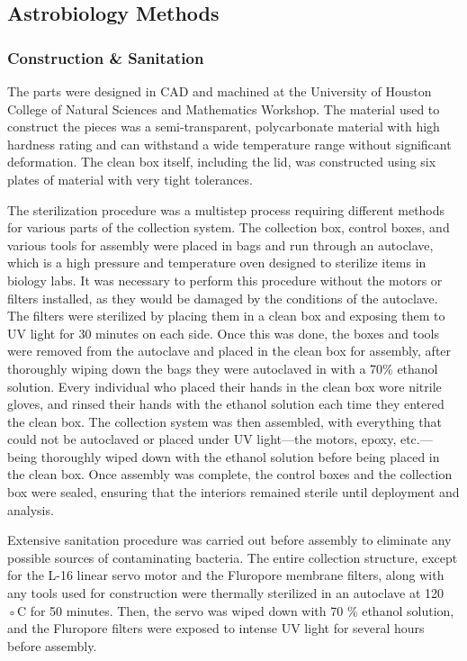 \subsection{Astrobiology Methods}
\label{sec:Astrobiology-Methods}

\subsubsection{Construction \& Sanitation}
\label{sec:Construction and Sanitation}
The parts were designed in CAD and machined at the University of Houston College of Natural Sciences and Mathematics Workshop. The material used to construct the pieces was a semi-transparent, polycarbonate material with high hardness rating and can withstand a wide temperature range without significant deformation. The clean box itself, including the lid, was constructed using six plates of material with very tight tolerances. 

The sterilization procedure was a multistep process requiring different methods for various parts of the
collection system. The collection box, control boxes, and various tools for assembly were placed in bags
and run through an autoclave, which is a high pressure and temperature oven designed to sterilize items in
biology labs. It was necessary to perform this procedure without the motors or filters installed, as they
would be damaged by the conditions of the autoclave. The filters were sterilized by placing them in a
clean box and exposing them to UV light for 30 minutes on each side. Once this was done, the boxes and
tools were removed from the autoclave and placed in the clean box for assembly, after thoroughly wiping
down the bags they were autoclaved in with a 70\% ethanol solution. Every individual who placed their
hands in the clean box wore nitrile gloves, and rinsed their hands with the ethanol solution each time they
entered the clean box. The collection system was then assembled, with everything that could not be
autoclaved or placed under UV light—the motors, epoxy, etc.—being thoroughly wiped down with the
ethanol solution before being placed in the clean box. Once assembly was complete, the control boxes and
the collection box were sealed, ensuring that the interiors remained sterile until deployment and analysis.

Extensive sanitation procedure was carried out before assembly to eliminate any possible sources of contaminating bacteria. The entire collection structure, except for the L-16 linear servo motor and the Fluropore membrane filters, along with any tools used for construction were thermally sterilized in an autoclave at 120 ◦C for 50 minutes. Then, the servo was wiped down with 70 \% ethanol solution, and the Fluropore filters were exposed to intense UV light for several hours before assembly.

